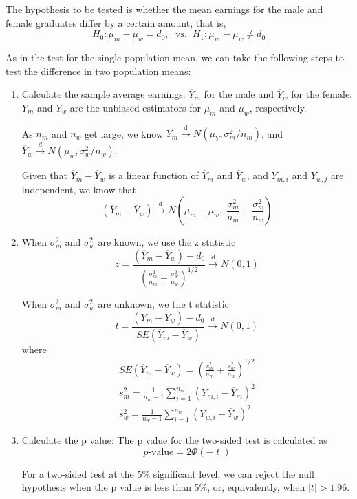\documentclass[a4paper,11pt]{article}
\begin{document}
The hypothesis to be tested is whether the mean earnings for the male and
female graduates differ by a certain amount, that is, 
\[ H_0: \mu_m - \mu_w = d_0,\; \text{ vs. }\: H_1: \mu_m - \mu_w \neq d_0 \]

As in the test for the single population mean, we can take the
following steps to test the difference in two population means:
\begin{enumerate}
\item Calculate the sample average earnings: \(\overline{Y}_m\) for the
male and \(\overline{Y}_w\) for the female. \(\overline{Y}_m\) and
\(\overline{Y}_w\) are the unbiased estimators for \(\mu_m\) and
\(\mu_w\), respectively.

As \(n_m\) and \(n_w\) get large, we know \(\overline{Y}_m
   \xrightarrow{\text{ d }} N(\mu_Y, \sigma^2_m/n_m)\), and
\(\overline{Y}_w \xrightarrow{d} N(\mu_w, \sigma^2_w / n_w)\). 

Given that \(\overline{Y}_m - \overline{Y}_w\) is a linear function
of \(\overline{Y}_m\) and \(\overline{Y}_w\), and \(Y_{m,i}\) and
\(Y_{w,j}\) are independent, we know that 
\[(\overline{Y}_m - \overline{Y}_w) \xrightarrow{d} N(\mu_m -
   \mu_w,\; \frac{\sigma^2_m}{n_m} + \frac{\sigma^2_w}{n_w}) \]

\item When \(\sigma^2_m\) and \(\sigma^2_w\) are known, we use the z statistic
\[ z = \frac{(\overline{Y}_m - \overline{Y}_w) - d_0}{\left(
   \frac{\sigma^2_m}{n_m} + \frac{\sigma^2_w}{n_w} \right)^{1/2}}
   \xrightarrow{\text{ d }} N(0, 1) \]

When \(\sigma^2_m\) and \(\sigma^2_w\) are unknown, we the t
statistic
\[ t = \frac{(\overline{Y}_m - \overline{Y}_w) -
   d_0}{SE(\overline{Y}_m - \overline{Y}_w)} \xrightarrow{\text{ d }}
   N(0, 1) \] 
where
\begin{gather*}
SE(\overline{Y}_m - \overline{Y}_w) = \left(\frac{s^2_m}{n_m} + \frac{s^2_w}{n_w} \right)^{1/2} \\
s^2_m = \frac{1}{n_m-1}\sum^{n_m}_{i=1}(Y_{m,i} - \overline{Y}_m)^2 \\
s^2_w = \frac{1}{n_w-1}\sum^{n_w}_{i=1}(Y_{w,i} - \overline{Y}_w)^2
\end{gather*}

\item Calculate the p value: The p value for the two-sided test is calculated as 
\[ p\text{-value} = 2\Phi(-|t|) \]

For a two-sided test at the 5\% significant level, we can reject
the null hypothesis when the p value is less than 5\%, or,
equivalently, when \(|t| > 1.96\).
\end{enumerate}
\end{document}
